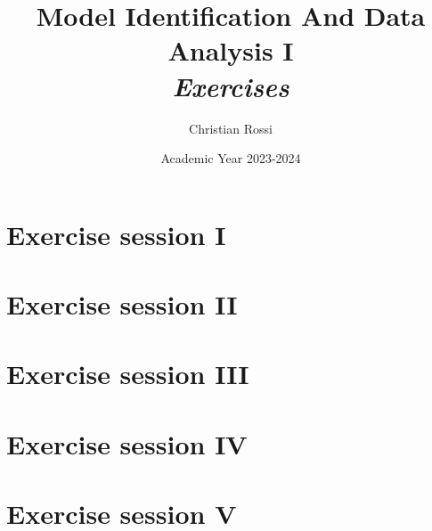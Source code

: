 \documentclass[12pt, a4paper]{report}
\title{Model Identification And Data Analysis I \\ \textit{Exercises}}
\author{Christian Rossi}
\date{Academic Year 2023-2024}
\begin{document}
    \maketitle

    

    \cleardoublepage

    \tableofcontents

    \cleardoublepage

    \chapter{Exercise session I}
    
    
    

    \chapter{Exercise session II}
    
    
    

    \chapter{Exercise session III}
    
    
    

    \chapter{Exercise session IV}
    
    
    
    

    \chapter{Exercise session V}
\end{document}
